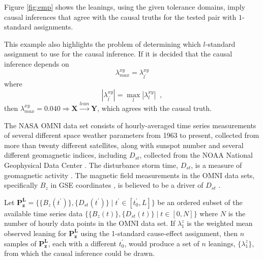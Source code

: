 \documentclass[twocolumn,aps,pre,groupedaddress]{revtex4-1}
\begin{document}
Figure \ref{fig:emp} shows the leanings, using the given tolerance domains, imply causal inferences that agree with the causal truths for the tested pair with $1$-standard assignments.    

This example also highlights the problem of determining which $l$-standard assignment to use for the causal inference.  If it is decided that the causal inference depends on
\begin{equation}
\lambda^{xy}_{max} = \lambda^{xy}_{l^\prime}
\end{equation}
where
\begin{equation}
|\lambda^{xy}_{l^\prime}| = \max_l |\lambda^{xy}_l|\;\;,
\end{equation}
then $\lambda^{xy}_{max}=0.040\Rightarrow\mathbf{X}\xrightarrow{lean}\mathbf{Y}$, which agrees with the causal truth.   

The NASA OMNI data set consists of hourly-averaged time series measurements of several different space weather parameters from 1963 to present, collected from more than twenty different satellites, along with sunspot number and several different geomagnetic indices, including $D_{st}$, collected from the NOAA National Geophysical Data Center \cite{King2005}.  The disturbance storm time, $D_{st}$, is a measure of geomagnetic activity \cite{IAGA}.  The magnetic field measurements in the OMNI data sets, specifically $B_z$ in GSE coordinates \cite{Hapgood1992}, is believed to be a driver of $D_{st}$ \cite{Gonz1994}.

Let $\mathbf{P_{z}^L}=\{\{B_z(t^\prime)\},\{D_{st}(t^\prime)\}\;|\;t^\prime\in[t^\prime_0,L]\}$ be an ordered subset of the available time series data $\{\{B_z(t)\},\{D_{st}(t)\}\;|\;t\in[0,N]\}$ where $N$ is the number of hourly data points in the OMNI data set.  If $\lambda_1^{z}$ is the weighted mean observed leaning for $\mathbf{P_{z}^L}$ using the 1-standard cause-effect assignment, then $n$ samples of $\mathbf{P_{z}^L}$, each with a different $t^\prime_0$,  would produce a set of $n$ leanings, $\{\lambda_1^{z}\}$, from which the causal inference could be drawn.
\end{document}
